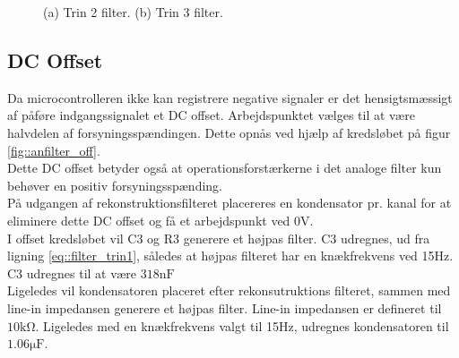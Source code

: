 \begin{figure}[h]
	\centering
	\caption{(a) Trin 2 filter. (b) Trin 3 filter.}
\end{figure}
\FloatBlock

\subsection{DC Offset}
Da microcontrolleren ikke kan registrere negative signaler er det hensigtsmæssigt af påføre indgangssignalet et DC offset. Arbejdspunktet vælges til at være halvdelen af forsyningsspændingen. Dette opnås ved hjælp af kredsløbet på figur \ref{fig::anfilter_off}. \\
Dette DC offset betyder også at operationsforstærkerne i det analoge filter kun behøver en positiv forsyningsspænding. \\
På udgangen af rekonstruktionsfilteret placereres en kondensator pr. kanal for at eliminere dette DC offset og få et arbejdspunkt ved 0V.\\
I offset kredsløbet vil C3 og R3 generere et højpas filter. C3 udregnes, ud fra ligning \ref{eq::filter_trin1}, således at højpas filteret har en knækfrekvens ved 15Hz. C3 udregnes til at være $318\si{\nano\farad}$\\
Ligeledes vil kondensatoren placeret efter rekonsutruktions filteret, sammen med line-in impedansen generere et højpas filter. Line-in impedansen er defineret til $10\si{\kilo\ohm}$. Ligeledes med en knækfrekvens valgt til 15Hz, udregnes kondensatoren til $1.06\si{\micro\farad}$.

